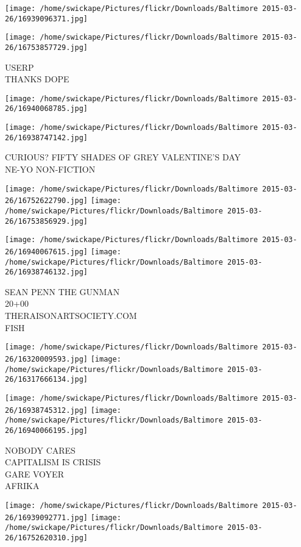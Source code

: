 \documentclass[10pt,letterpaper]{article}
\begin{document}
\texttt{[image: /home/swickape/Pictures/flickr/Downloads/Baltimore 2015-03-26/16939096371.jpg]}

\vspace{0.25in}
\texttt{[image: /home/swickape/Pictures/flickr/Downloads/Baltimore 2015-03-26/16753857729.jpg]}

USERP\\
THANKS DOPE
\pagebreak

\texttt{[image: /home/swickape/Pictures/flickr/Downloads/Baltimore 2015-03-26/16940068785.jpg]}

\vspace{0.25in}
\texttt{[image: /home/swickape/Pictures/flickr/Downloads/Baltimore 2015-03-26/16938747142.jpg]}

CURIOUS?  FIFTY SHADES OF GREY VALENTINE'S DAY\\
NE{-}YO NON{-}FICTION
\pagebreak

\texttt{[image: /home/swickape/Pictures/flickr/Downloads/Baltimore 2015-03-26/16752622790.jpg]}
\texttt{[image: /home/swickape/Pictures/flickr/Downloads/Baltimore 2015-03-26/16753856929.jpg]}

\texttt{[image: /home/swickape/Pictures/flickr/Downloads/Baltimore 2015-03-26/16940067615.jpg]}
\texttt{[image: /home/swickape/Pictures/flickr/Downloads/Baltimore 2015-03-26/16938746132.jpg]}

SEAN PENN THE GUNMAN\\
20+00\\
THERAISONARTSOCIETY.COM\\
FISH
\pagebreak

\texttt{[image: /home/swickape/Pictures/flickr/Downloads/Baltimore 2015-03-26/16320009593.jpg]}
\texttt{[image: /home/swickape/Pictures/flickr/Downloads/Baltimore 2015-03-26/16317666134.jpg]}

\texttt{[image: /home/swickape/Pictures/flickr/Downloads/Baltimore 2015-03-26/16938745312.jpg]}
\texttt{[image: /home/swickape/Pictures/flickr/Downloads/Baltimore 2015-03-26/16940066195.jpg]}

NOBODY CARES\\
CAPITALISM IS CRISIS\\
GARE VOYER\\
AFRIKA
\pagebreak

\texttt{[image: /home/swickape/Pictures/flickr/Downloads/Baltimore 2015-03-26/16939092771.jpg]}
\texttt{[image: /home/swickape/Pictures/flickr/Downloads/Baltimore 2015-03-26/16752620310.jpg]}
\end{document}
